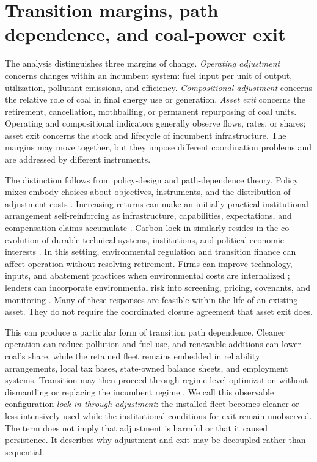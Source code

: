 \documentclass[11pt]{article}
\begin{document}
\section{Transition margins, path dependence, and coal-power exit}

The analysis distinguishes three margins of change. \textit{Operating adjustment} concerns changes within an incumbent system: fuel input per unit of output, utilization, pollutant emissions, and efficiency. \textit{Compositional adjustment} concerns the relative role of coal in final energy use or generation. \textit{Asset exit} concerns the retirement, cancellation, mothballing, or permanent repurposing of coal units. Operating and compositional indicators generally observe flows, rates, or shares; asset exit concerns the stock and lifecycle of incumbent infrastructure. The margins may move together, but they impose different coordination problems and are addressed by different instruments.

The distinction follows from policy-design and path-dependence theory. Policy mixes embody choices about objectives, instruments, and the distribution of adjustment costs \parencite{howlett2010}. Increasing returns can make an initially practical institutional arrangement self-reinforcing as infrastructure, capabilities, expectations, and compensation claims accumulate \parencite{arthur1989,pierson2000,mahoney2000}. Carbon lock-in similarly resides in the co-evolution of durable technical systems, institutions, and political-economic interests \parencite{unruh2000}. In this setting, environmental regulation and transition finance can affect operation without resolving retirement. Firms can improve technology, inputs, and abatement practices when environmental costs are internalized \parencite{portervanderlinde1995,popp2002,acemogluetal2012}; lenders can incorporate environmental risk into screening, pricing, covenants, and monitoring \parencite{stiglitzweiss1981,campiglio2016,dikauvolz2021}. Many of these responses are feasible within the life of an existing asset. They do not require the coordinated closure agreement that asset exit does.

This can produce a particular form of transition path dependence. Cleaner operation can reduce pollution and fuel use, and renewable additions can lower coal's share, while the retained fleet remains embedded in reliability arrangements, local tax bases, state-owned balance sheets, and employment systems. Transition may then proceed through regime-level optimization without dismantling or replacing the incumbent regime \parencite{geels2002,geelsschot2007,markardetal2012}. We call this observable configuration \textit{lock-in through adjustment}: the installed fleet becomes cleaner or less intensively used while the institutional conditions for exit remain unobserved. The term does not imply that adjustment is harmful or that it caused persistence. It describes why adjustment and exit may be decoupled rather than sequential.
\end{document}
